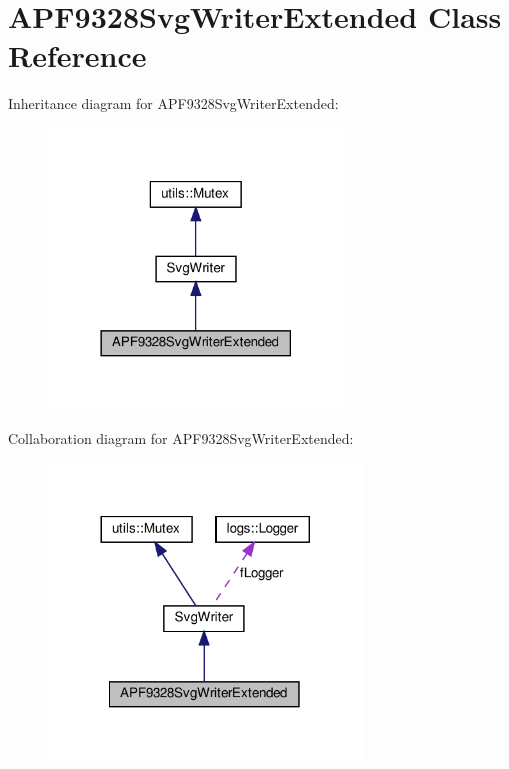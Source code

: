 \hypertarget{classAPF9328SvgWriterExtended}{}\section{A\+P\+F9328\+Svg\+Writer\+Extended Class Reference}
\label{classAPF9328SvgWriterExtended}


Inheritance diagram for A\+P\+F9328\+Svg\+Writer\+Extended\+:
\nopagebreak
\begin{figure}[H]
\begin{center}
\leavevmode
\includegraphics[width=222pt]{classAPF9328SvgWriterExtended__inherit__graph}
\end{center}
\end{figure}


Collaboration diagram for A\+P\+F9328\+Svg\+Writer\+Extended\+:
\nopagebreak
\begin{figure}[H]
\begin{center}
\leavevmode
\includegraphics[width=236pt]{classAPF9328SvgWriterExtended__coll__graph}
\end{center}
\end{figure}

